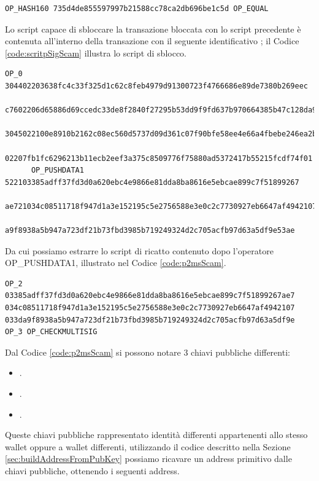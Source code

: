 \begin{example}
\begin{lstlisting}[language=bitcoinscript, label={code:scriptPubKeyScam}, caption={Script da cui è originato l'address preso in esempio.}]
      OP_HASH160 735d4de855597997b21588cc78ca2db696be1c5d OP_EQUAL
   \end{lstlisting}
   Lo script capace di sbloccare la transazione bloccata con lo script precedente è contenuta all'interno della transazione con il seguente identificativo ; il Codice \ref{code:scritpSigScam} illustra lo script di sblocco.
     \begin{lstlisting}[language=bitcoinscript, label={code:scritpSigScam}, caption={Script con cui è possibile eseguire con successo lo script illustrato attraverso il Codice \ref{code:scriptPubKeyScam}.}]
      OP_0 304402203638fc4c33f325d1c62c8feb4979d91300723f4766686e89de7380b269eec
        c7602206d65886d69ccedc33de8f2840f27295b53dd9f9fd637b970664385b47c128da901
        3045022100e8910b2162c08ec560d5737d09d361c07f90bfe58ee4e66a4fbebe246ea2b32c
        02207fb1fc6296213b11ecb2eef3a375c8509776f75880ad5372417b55215fcdf74f01
      OP_PUSHDATA1 522103385adff37fd3d0a620ebc4e9866e81dda8ba8616e5ebcae899c7f51899267
        ae721034c08511718f947d1a3e152195c5e2756588e3e0c2c7730927eb6647af494210721033d
        a9f8938a5b947a723df21b73fbd3985b719249324d2c705acfb97d63a5df9e53ae
     \end{lstlisting}
     Da cui possiamo estrarre lo script di ricatto contenuto dopo l'operatore OP\_PUSHDATA1, illustrato nel Codice \ref{code:p2msScam}.
     \begin{lstlisting}[language=bitcoinscript, label={code:p2msScam}, caption={Readme Script contenuto all'interno dello script di sblocco \ref{code:scritpSigScam}.}]
      OP_2 03385adff37fd3d0a620ebc4e9866e81dda8ba8616e5ebcae899c7f51899267ae7 034c08511718f947d1a3e152195c5e2756588e3e0c2c7730927eb6647af4942107 033da9f8938a5b947a723df21b73fbd3985b719249324d2c705acfb97d63a5df9e OP_3 OP_CHECKMULTISIG
    \end{lstlisting}
    Dal Codice \ref{code:p2msScam} si possono notare 3 chiavi pubbliche differenti:
    \begin{itemize}
      \item {}.
      \item {}.
      \item {}.
    \end{itemize}
    Queste chiavi pubbliche rappresentato identità differenti appartenenti allo stesso wallet oppure a wallet differenti, utilizzando il codice descritto nella Sezione \ref{sec:buildAddressFromPubKey} possiamo ricavare un address primitivo dalle chiavi pubbliche, ottenendo i seguenti address.

\end{example}
